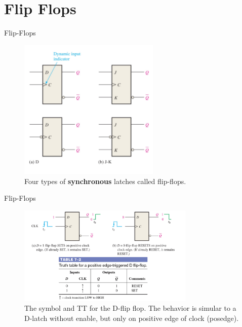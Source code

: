 \documentclass{beamer}
\begin{document}
\section{Flip Flops}

\begin{frame}{Flip-Flops}
\begin{figure}
\centering
\includegraphics[width=0.6\textwidth]{figures/edge1.pdf}
\caption{\label{fig:ff1} Four types of \textbf{synchronous} latches called flip-flops.}
\end{figure}
\end{frame}

\begin{frame}{Flip-Flops}
\begin{figure}
\centering
\includegraphics[width=0.75\textwidth]{figures/edge2.pdf}
\caption{\label{fig:ff2} The symbol and TT for the D-flip flop.  The behavior is simular to a D-latch without enable, but only on positive edge of clock (posedge).}
\end{figure}
\end{frame}
\end{document}
